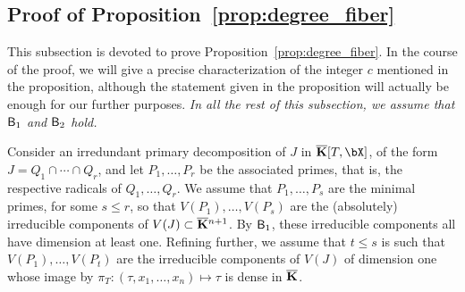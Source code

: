 \documentclass[12pt]{article}
\begin{document}

\subsection{Proof of Proposition~\ref{prop:degree_fiber}}

This subsection is devoted to prove
Proposition~\ref{prop:degree_fiber}. In the course of the proof, we
will give a precise characterization of the integer $c$ mentioned in
the proposition, although the statement given in the proposition will
actually be enough for our further purposes. {\em In all the rest of
  this subsection, we assume that $\mathsf{B}_1$ and $\mathsf{B}_2$ hold.}

Consider an irredundant primary decomposition of $J$ in
$\KKbar[T,\bX]$, of the form $J=Q_1 \cap \cdots
\cap Q_r$, and let $P_1,\dots,P_r$ be the associated primes, that is,
the respective radicals of $Q_1,\dots,Q_r$. We assume that
$P_1,\dots,P_s$ are the minimal primes, for some $s \le r$, so that
$V(P_1),\dots,V(P_s)$ are the (absolutely) irreducible components of
$V(J)\subset \overline{\mathbf{K}}{}^{n+1}$. By $\mathsf{B}_1$, these irreducible
components all have dimension at least one. Refining further, we
assume that $t \le s$ is such that $V(P_1),\dots,V(P_t)$ are the
 irreducible components of $V(J)$ of dimension one whose
image by $\pi_T: (\tau,x_1,\dots,x_n) \mapsto \tau$ is dense in
$\overline{\mathbf{K}}$.
\end{document}
